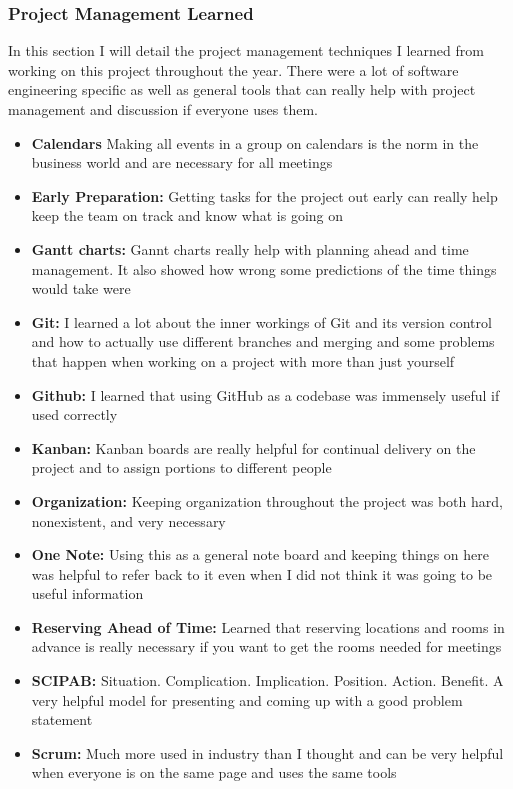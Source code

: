 \documentclass[draftclsnofoot, onecolumn, compsoc, 10pt]{IEEEtran}
\begin{document}
\subsubsection{Project Management Learned}
In this section I will detail the project management techniques I learned from working on this project throughout the year. There were a lot of software engineering specific as well as general tools that can really help with project management and discussion if everyone uses them.
\begin{itemize}
    \item \textbf{Calendars} Making all events in a group on calendars is the norm in the business world and are necessary for all meetings
    \item \textbf{Early Preparation:} Getting tasks for the project out early can really help keep the team on track and know what is going on
    \item \textbf{Gantt charts:} Gannt charts really help with planning ahead and time management. It also showed how wrong some predictions of the time things would take were
    \item \textbf{Git:} I learned a lot about the inner workings of Git and its version control and how to actually use different branches and merging and some problems that happen when working on a project with more than just yourself
    \item \textbf{Github:} I learned that using GitHub as a codebase was immensely useful if used correctly
    \item \textbf{Kanban:} Kanban boards are really helpful for continual delivery on the project and to assign portions to different people
    \item \textbf{Organization:} Keeping organization throughout the project was both hard, nonexistent, and very necessary
    \item \textbf{One Note:} Using this as a general note board and keeping things on here was helpful to refer back to it even when I did not think it was going to be useful information
    \item \textbf{Reserving Ahead of Time:} Learned that reserving locations and rooms in advance is really necessary if you want to get the rooms needed for meetings
    \item \textbf{SCIPAB:} Situation. Complication. Implication. Position. Action. Benefit. A very helpful model for presenting and coming up with a good problem statement
    \item \textbf{Scrum:} Much more used in industry than I thought and can be very helpful when everyone is on the same page and uses the same tools
\end{itemize}
\end{document}
